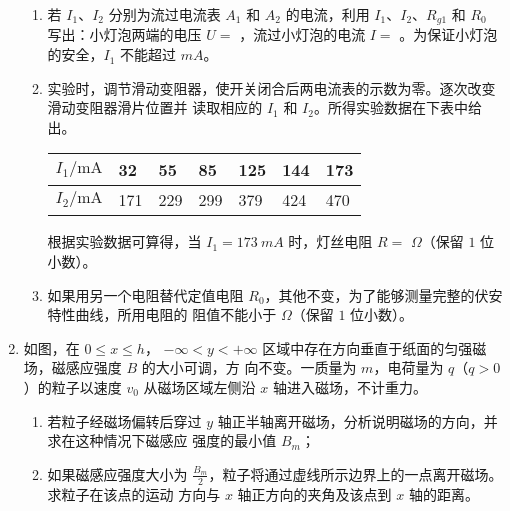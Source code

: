 \begin{enumerate}
\begin{enumerate}
\item 
若 $ I_{1} $、$ I_{2} $ 分别为流过电流表 $ A_{1} $ 和 $ A_{2} $ 的电流，利用 $ I_{1} $、$ I_{2} $、$ R_{g1} $ 和 $ R_{0} $ 写出：小灯泡两端的电压 $ U= $ \underlinegap 
，流过小灯泡的电流 $ I= $ \underlinegap 。为保证小灯泡的安全，$ I_{1} $ 不能超过 \underlinegap $ mA $。

\item 
实验时，调节滑动变阻器，使开关闭合后两电流表的示数为零。逐次改变滑动变阻器滑片位置并
读取相应的 $ I_{1} $ 和 $ I_{2} $。所得实验数据在下表中给出。
\begin{table}[h!]
\centering 
\begin{tabular}{|l|l|l|l|l|l|l|}
\hline$I_{1} / \mathrm{mA}$ & 32 & 55 & 85 & 125 & 144 & 173 \\
\hline$I_{2} / \mathrm{mA}$ & 171 & 229 & 299 & 379 & 424 & 470 \\
\hline
\end{tabular}
\end{table} 





根据实验数据可算得，当 $ I_{1} =173 \ mA $ 时，灯丝电阻 $ R=$ \underlinegap $ \Omega $（保留 $ 1 $ 位小数）。


\item 
如果用另一个电阻替代定值电阻 $ R_{0} $，其他不变，为了能够测量完整的伏安特性曲线，所用电阻的
阻值不能小于 \underlinegap $ \Omega $（保留 $ 1 $ 位小数）。

\end{enumerate}




\newpage

\gaokaojs

\item
如图，在 $ 0 \leq x \leq h $， $ - \infty <y<+ \infty$ 区域中存在方向垂直于纸面的匀强磁场，磁感应强度 $ B $ 的大小可调，方
向不变。一质量为 $ m $，电荷量为 $ q $（$ q>0 $）的粒子以速度 $ v_{0} $ 从磁场区域左侧沿 $ x $ 轴进入磁场，不计重力。
\begin{enumerate}
\item
若粒子经磁场偏转后穿过 $ y $ 轴正半轴离开磁场，分析说明磁场的方向，并求在这种情况下磁感应
强度的最小值 $ B_{m} $；
\item 
如果磁感应强度大小为
$\frac{B_{m}}{2}$，粒子将通过虚线所示边界上的一点离开磁场。求粒子在该点的运动
方向与 $ x $ 轴正方向的夹角及该点到 $ x $ 轴的距离。


\end{enumerate}
\end{enumerate}
